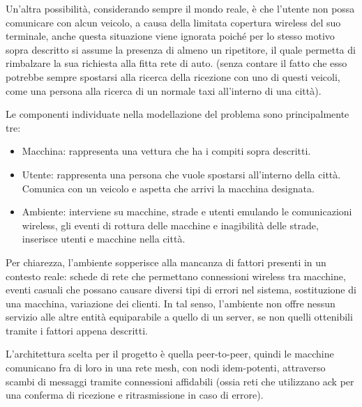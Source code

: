 Un'altra possibilità, considerando sempre il mondo reale, è che l'utente non possa comunicare con alcun veicolo, a causa della limitata copertura wireless del suo terminale, anche questa situazione viene ignorata poiché per lo stesso motivo sopra descritto si assume la presenza di almeno un ripetitore, il quale permetta di rimbalzare la sua richiesta alla fitta rete di auto. (senza contare il fatto che esso potrebbe sempre spostarsi alla ricerca della ricezione con uno di questi veicoli, come una persona alla ricerca di un normale taxi all'interno di una città).

Le componenti individuate nella modellazione del problema sono principalmente tre:
\begin{itemize}
	\item Macchina: rappresenta una vettura che ha i compiti sopra descritti.
	\item Utente: rappresenta una persona che vuole spostarsi all'interno della città. Comunica con un veicolo e aspetta che arrivi la macchina designata.
	\item Ambiente: interviene su macchine, strade e utenti emulando le comunicazioni wireless, gli eventi di rottura delle macchine e inagibilità delle strade, inserisce utenti e macchine nella città.
\end{itemize}

Per chiarezza, l'ambiente sopperisce alla mancanza di fattori presenti in un contesto reale: schede di rete che permettano connessioni wireless tra macchine, eventi casuali che possano causare diversi tipi di errori nel sistema, sostituzione di una macchina, variazione dei clienti. In tal senso, l'ambiente non offre nessun servizio alle altre entità equiparabile a quello di un server, se non quelli ottenibili tramite i fattori appena descritti.

L'architettura scelta per il progetto è quella peer-to-peer, quindi le macchine comunicano fra di loro in una rete mesh, con nodi idem-potenti, attraverso scambi di messaggi tramite connessioni affidabili (ossia reti che utilizzano ack per una conferma di ricezione e ritrasmissione in caso di errore).

